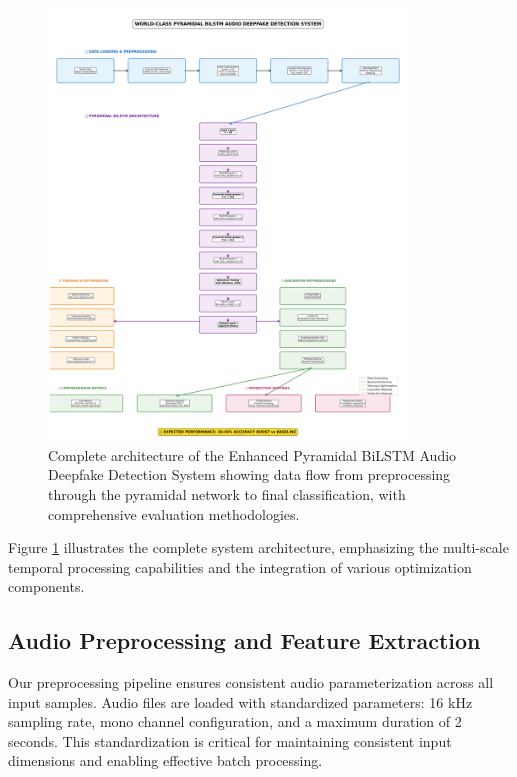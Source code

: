 \documentclass[conference]{IEEEtran}
\begin{document}
\begin{figure}[!t]
\centering
\includegraphics[width=0.85\textwidth]{pyramidal_bilstm_architecture.jpg}
\caption{Complete architecture of the Enhanced Pyramidal BiLSTM Audio Deepfake Detection System showing data flow from preprocessing through the pyramidal network to final classification, with comprehensive evaluation methodologies.}
\label{fig:architecture}
\end{figure}

Figure \ref{fig:architecture} illustrates the complete system architecture, emphasizing the multi-scale temporal processing capabilities and the integration of various optimization components.

\subsection{Audio Preprocessing and Feature Extraction}

Our preprocessing pipeline ensures consistent audio parameterization across all input samples. Audio files are loaded with standardized parameters: 16 kHz sampling rate, mono channel configuration, and a maximum duration of 2 seconds. This standardization is critical for maintaining consistent input dimensions and enabling effective batch processing.
\end{document}
